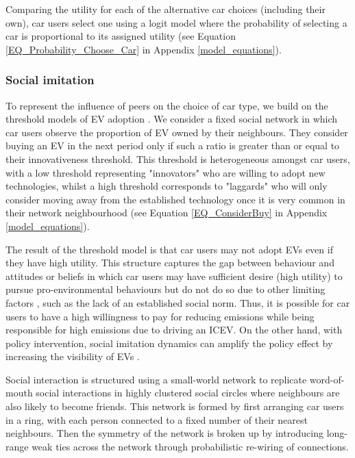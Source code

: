 \documentclass[12pt]{article}
\begin{document}
	Comparing the utility for each of the alternative car choices (including their own), car users select one using a logit model \citep{McFadden1974} where the probability of selecting a car is proportional to its assigned utility (see Equation \ref{EQ_Probability_Choose_Car} in Appendix \ref{model_equations}). %
	
	\subsubsection{Social imitation} \label{Users_SocialImitation}
	
	To represent the influence of peers on the choice of car type, we build on the threshold models of EV adoption \citep{eppstein2011agent, mccoy2014consumer, wang2023exploring}. We consider a fixed social network in which car users observe the proportion of EV owned by their neighbours. They consider buying an EV in the next period only if such a ratio is greater than or equal to their innovativeness threshold. This threshold is heterogeneous amongst car users, with a low threshold representing "innovators" who are willing to adopt new technologies, whilst a high threshold corresponds to "laggards" who will only consider moving away from the established technology once it is very common in their network neighbourhood (see Equation \ref{EQ_ConsiderBuy} in Appendix \ref{model_equations}).
	
	The result of the threshold model is that car users may not adopt EVs even if they have high utility. This structure captures the gap between behaviour and attitudes or beliefs in which car users may have sufficient desire (high utility) to pursue pro-environmental behaviours but do not do so due to other limiting factors \citep{kollmuss2002mind}, such as the lack of an established social norm. Thus, it is possible for car users to have a high willingness to pay for reducing emissions while being responsible for high emissions due to driving an ICEV. On the other hand, with policy intervention, social imitation dynamics can amplify the policy effect by increasing the visibility of EVs \citep{konc2021social}.    
	
	Social interaction is structured using a small-world network \citep{watts1998collective} to replicate word-of-mouth social interactions in highly clustered social circles where neighbours are also likely to become friends. This network is formed by first arranging car users in a ring, with each person connected to a fixed number of their nearest neighbours. Then the symmetry of the network is broken up by introducing long-range weak ties across the network through probabilistic re-wiring of connections.
	
\end{document}
